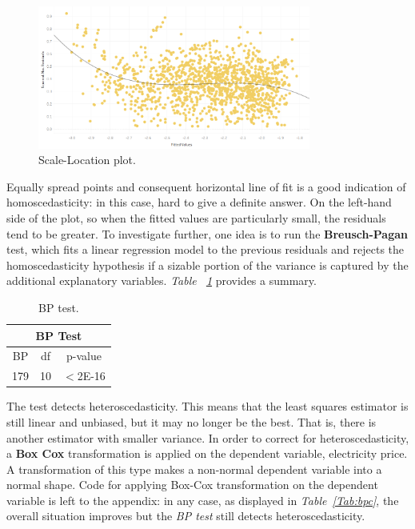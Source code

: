 \documentclass[a4paper,12pt]{book}
\begin{document}
\begin{figure}[tb]
\begin{center}
\captionsetup{justification=centering}
\includegraphics[width=0.8\textwidth]{Images/scalelog.png}
\caption{Scale-Location plot.}
\label{fig:slp}
\end{center}
\end{figure}

Equally spread points and consequent horizontal line of fit is a good indication of homoscedasticity: in this case, hard to give a definite answer. On the left-hand side of the plot, so when the fitted values are particularly small, the residuals tend to be greater. To investigate further, one idea is to run the \textbf{Breusch-Pagan} test, which fits a linear regression model to the previous residuals and rejects the homoscedasticity hypothesis if a sizable portion of the variance is captured by the additional explanatory variables. \textit{Table ~\ref{Tab:bpt}} provides a summary.

\begin{table}[tb]
\begin{center}
\begin{tabular}{|c|c|c|}
\hline
\multicolumn{3}{|c|}{BP Test}\\
\hline
BP&df&p-value\\
179&10&$<$2E-16\\
\hline
\end{tabular}
\caption{BP test.}
\label{Tab:bpt}
\end{center}
\end{table}

The test detects heteroscedasticity. This means that the least squares estimator is still linear and unbiased, but it may no longer be the best. That is, there is another estimator with smaller variance. In order to correct for heteroscedasticity, a \textbf{Box Cox} transformation is applied on the dependent variable, electricity price. A transformation of this type makes a non-normal dependent variable into a normal shape. \cite{box1964analysis} Code for applying Box-Cox transformation on the dependent variable is left to the appendix: in any case, as displayed in \textit{Table~\ref{Tab:bpc}}, the overall situation improves but the \textit{BP test} still detects heteroscedasticity.
\end{document}
